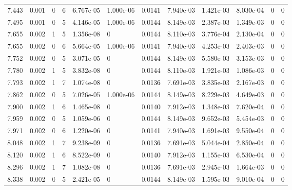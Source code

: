 \documentclass[preview]{standalone}
\begin{document}
{{{\begin{tabular}{L{1.2cm}C{1.2cm} C{0.3cm}C{0.5cm} C{1.4cm}C{1.4cm} C{1.4cm}C{1.4cm} C{1.6cm}C{1.6cm} C{1.6cm}C{1.6cm}}
  7.443  &  0.001  & 0     &  6 &  6.767e-05  & 1.000e-06  &  0.0141&   7.940e-03& 1.421e-03 & 8.030e-04   &  0 & 0  \\ 
  7.495  &  0.001  & 0     &  5 &  4.146e-05  & 1.000e-06  &  0.0144&   8.149e-03& 2.387e-03 & 1.349e-03   &  0 & 0  \\ 
  7.655  &  0.002  & 1     &  5 &  1.356e-08  & 0  &  0.0144&   8.110e-03& 3.776e-04 & 2.130e-04   &  0 & 0  \\ 
  7.655  &  0.002  & 0     &  6 &  5.664e-05  & 1.000e-06  &  0.0141&   7.940e-03& 4.253e-03 & 2.403e-03   &  0 & 0  \\ 
  7.752  &  0.002  & 0     &  5 &  3.071e-05  & 0  &  0.0144&   8.149e-03& 5.580e-03 & 3.153e-03   &  0 & 0  \\ 
  7.780  &  0.002  & 1     &  5 &  3.832e-08  & 0  &  0.0144&   8.110e-03& 1.921e-03 & 1.086e-03   &  0 & 0  \\ 
  7.793  &  0.002  & 1     &  7 &  1.074e-08  & 0  &  0.0136&   7.691e-03& 3.835e-03 & 2.167e-03   &  0 & 0  \\ 
  7.862  &  0.002  & 0     &  5 &  7.026e-05  & 1.000e-06  &  0.0144&   8.149e-03& 8.229e-03 & 4.649e-03   &  0 & 0  \\ 
  7.900  &  0.002  & 1     &  6 &  1.465e-08  & 0  &  0.0140&   7.912e-03& 1.348e-03 & 7.620e-04   &  0 & 0  \\ 
  7.959  &  0.002  & 0     &  5 &  1.059e-06  & 0  &  0.0144&   8.149e-03& 9.652e-03 & 5.454e-03   &  0 & 0  \\ 
  7.971  &  0.002  & 0     &  6 &  1.220e-06  & 0  &  0.0141&   7.940e-03& 1.691e-03 & 9.550e-04   &  0 & 0  \\ 
  8.048  &  0.002  & 1     &  7 &  9.238e-09  & 0  &  0.0136&   7.691e-03& 5.044e-04 & 2.850e-04   &  0 & 0  \\ 
  8.120  &  0.002  & 1     &  6 &  8.522e-09  & 0  &  0.0140&   7.912e-03& 1.155e-03 & 6.530e-04   &  0 & 0  \\ 
  8.296  &  0.002  & 1     &  7 &  1.082e-08  & 0  &  0.0136&   7.691e-03& 2.945e-03 & 1.664e-03   &  0 & 0  \\ 
  8.338  &  0.002  & 0     &  5 &  2.421e-05  & 0  &  0.0144&   8.149e-03& 1.595e-03 & 9.010e-04   &  0 & 0  \\ 
\hline 
\end{tabular} 

}}}
\end{document}
